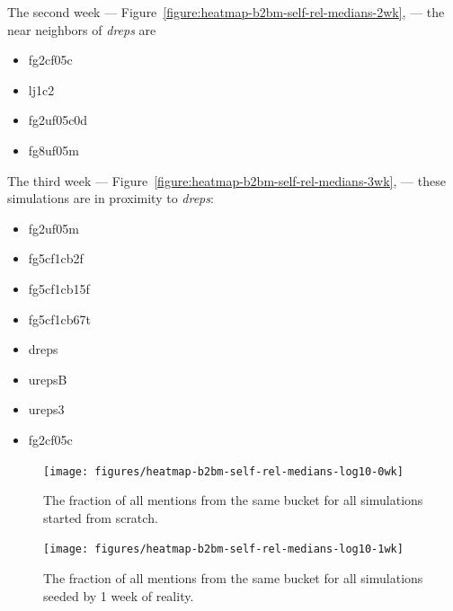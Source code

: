 \documentclass[10pt,oneside]{memoir}
\begin{document}
The second week --- Figure~\ref{figure:heatmap-b2bm-self-rel-medians-2wk}, --- the near neighbors of {\itshape dreps} are


\begin{itemize}


\item fg2cf05c

\item lj1c2

\item fg2uf05c0d

\item fg8uf05m
\end{itemize}

The third week --- Figure~\ref{figure:heatmap-b2bm-self-rel-medians-3wk}, --- these simulations are in proximity to {\itshape dreps}:


\begin{itemize}


\item fg2uf05m

\item fg5cf1cb2f

\item fg5cf1cb15f

\item fg5cf1cb67t

\item dreps

\item urepsB

\item ureps3

\item fg2cf05c
\end{itemize}


\begin{figure}
\begin{center}
    \texttt{[image: figures/heatmap-b2bm-self-rel-medians-log10-0wk]}
    \caption{The fraction of all mentions from the same bucket for all simulations started from scratch.}
    \label{figure:heatmap-b2bm-self-rel-medians-0wk}
\end{center}
\end{figure}

\begin{figure}
\begin{center}
    \texttt{[image: figures/heatmap-b2bm-self-rel-medians-log10-1wk]}
    \caption{The fraction of all mentions from the same bucket for all simulations seeded by 1 week of reality.}
    \label{figure:heatmap-b2bm-self-rel-medians-1wk}
\end{center}
\end{figure}
\end{document}
